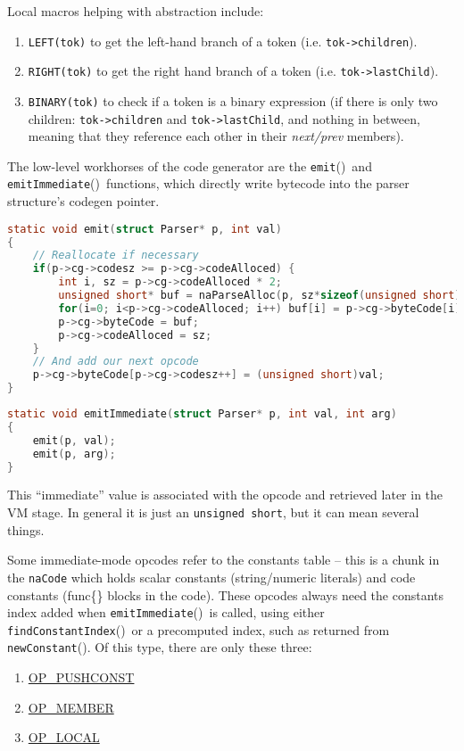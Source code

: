 \documentclass{article}
\newcommand{\name}[1]{{\it #1}}
\newcommand{\type}[1]{\textcolor{type}{\tt #1}}
\newcommand{\func}[1]{\textcolor{func}{\tt #1}}
\newcommand{\localmacro}[1]{\textcolor{func}{\tt #1}}
\newcommand{\nasalapi}[1]{\func{#1}}
\newcommand{\nasalkeyword}[1]{\textcolor{keyword}{#1}}
\newcommand{\OP} [1]{\hyperref[op:#1]{\textcolor{opcode}{OP\_#1}}}
\newcommand{\br}{\penalty3}
\newcommand{\fp}{\textcolor{func}{()}}
\begin{document}
Local macros helping with abstraction include:

\begin{enumerate}
\item \localmacro{LEFT(tok)} to get the left-hand branch of a token (i.e. \verb$tok->children$).
\item \localmacro{RIGHT(tok)} to get the right hand branch of a token (i.e. \verb$tok->lastChild$).
\item \localmacro{BINARY(tok)} to check if a token is a binary expression (if there is only two children: \verb$tok->children$ and \verb$tok->lastChild$, and nothing in between, meaning that they reference each other in their \name{next/prev} members).
\end{enumerate}

The low-level workhorses of the code generator are the \nasalapi{emit}\fp\ and \nasalapi{emit\br Immediate}\fp\ functions, which directly write bytecode into the parser structure's codegen pointer.

\begin{lstlisting}[language=C]
static void emit(struct Parser* p, int val)
{
    // Reallocate if necessary
    if(p->cg->codesz >= p->cg->codeAlloced) {
        int i, sz = p->cg->codeAlloced * 2;
        unsigned short* buf = naParseAlloc(p, sz*sizeof(unsigned short));
        for(i=0; i<p->cg->codeAlloced; i++) buf[i] = p->cg->byteCode[i];
        p->cg->byteCode = buf;
        p->cg->codeAlloced = sz;
    }
    // And add our next opcode
    p->cg->byteCode[p->cg->codesz++] = (unsigned short)val;
}
\end{lstlisting}

\begin{lstlisting}[language=C]
static void emitImmediate(struct Parser* p, int val, int arg)
{
    emit(p, val);
    emit(p, arg);
}
\end{lstlisting}

This ``immediate'' value is associated with the opcode and retrieved later in the VM stage.  In general it is just an \type{unsigned short}, but it can mean several things.

Some immediate-mode opcodes refer to the constants table -- this is a chunk in the \type{naCode} which holds scalar constants (string/numeric literals) and code constants (\nasalkeyword{func}\{\} blocks in the code).  These opcodes always need the constants index added when \nasalapi{emit\br Imme\-diate}\fp\ is called, using either \nasalapi{find\br Constant\br Index}\fp\ or a precomputed index, such as returned from \nasalapi{new\br Constant}\fp.  Of this type, there are only these three:
\begin{enumerate}
 \item \OP{PUSHCONST}
 \item \OP{MEMBER}
 \item \OP{LOCAL}
\end{enumerate}
\end{document}
